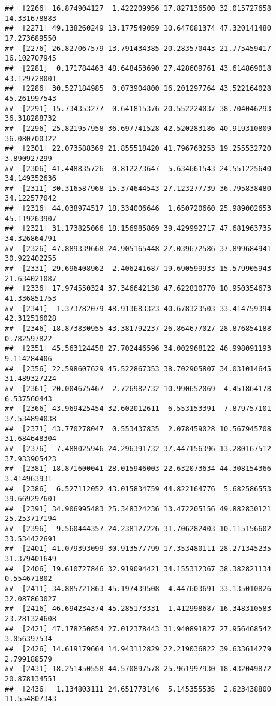 \documentclass[
]{article}
\begin{document}
\begin{verbatim}
##  [2266] 16.874904127  1.422209956 17.827136500 32.015727658 14.331678883
##  [2271] 49.138260249 13.177549059 10.647081374 47.320141480 17.273689550
##  [2276] 26.827067579 13.791434385 20.283570443 21.775459417 16.102707945
##  [2281]  0.171784463 48.648453690 27.428609761 43.614869018 43.129728001
##  [2286] 30.527184985  0.073904800 16.201297764 43.522164028 45.261997543
##  [2291] 15.734353277  0.641815376 20.552224037 38.704046293 36.318288732
##  [2296] 25.821957958 36.697741528 42.520283186 40.919310809 36.080700322
##  [2301] 22.073588369 21.855518420 41.796763253 19.255532720  3.890927299
##  [2306] 41.448835726  0.812273647  5.634661543 24.551225640 34.149352636
##  [2311] 30.316587968 15.374644543 27.123277739 36.795838480 34.122577042
##  [2316] 44.038974517 18.334006646  1.650720660 25.989002653 45.119263907
##  [2321] 31.173825066 18.156985869 39.429992717 47.681963735 34.326864791
##  [2326] 47.889339668 24.905165448 27.039672586 37.899684941 30.922402255
##  [2331] 29.696408962  2.406241687 19.690599933 15.579905943 21.634021087
##  [2336] 17.974550324 37.346642138 47.622810770 10.950354673 41.336851753
##  [2341]  1.373782079 48.913683323 40.678323503 33.414759394 42.312516028
##  [2346] 18.873830955 43.381792237 26.864677027 28.876854188  0.782597822
##  [2351] 45.563124458 27.702446596 34.002968122 46.998091193  9.114284406
##  [2356] 22.598607629 45.522867353 38.702905807 34.031014645 31.489327224
##  [2361] 20.004675467  2.726982732 10.990652069  4.451864178  6.537560443
##  [2366] 43.969425454 32.602012611  6.553153391  7.879757101 37.534894038
##  [2371] 43.770278047  0.553437835  2.078459028 10.567945708 31.684648304
##  [2376]  7.488025946 24.296391732 37.447156396 13.280167512 37.933905423
##  [2381] 18.871600041 28.015946003 22.632073634 44.308154366  3.414963931
##  [2386]  6.527112052 43.015834759 44.822164776  5.682586553 39.669297601
##  [2391] 34.906995483 25.348324236 13.472205156 49.882830121 25.253717194
##  [2396]  9.560444357 24.238127226 31.706282403 10.115156602 33.534422691
##  [2401] 41.079393099 30.913577799 17.353480111 28.271345235 31.379401649
##  [2406] 19.610727846 32.919094421 34.155312367 38.382821134  0.554671802
##  [2411] 34.885721863 45.197439508  4.447603691 33.135010826 32.087863027
##  [2416] 46.694234374 45.285173331  1.412998687 16.348310583 23.281324608
##  [2421] 47.178250854 27.012378443 31.940891827 27.956468542  3.056397534
##  [2426] 14.619179664 14.943112829 22.219036822 39.633614279  2.799188579
##  [2431] 18.251450558 44.570897578 25.961997930 18.432049872 20.878134551
##  [2436]  1.134803111 24.651773146  5.145355535  2.623438800 11.554807343

\end{verbatim}
\end{document}
